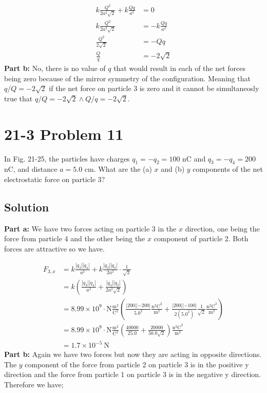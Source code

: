 \documentclass{article}
\begin{document}
\begin{align*}
    k \frac{Q^2}{2a^2\sqrt{2}} + k \frac{Qq}{a^2} &= 0 \\
    k \frac{Q^2}{2a^2\sqrt{2}} &= - k \frac{Qq}{a^2} \\
    \frac{Q^2}{2\sqrt{2}} &= - Qq \\
    \frac{Q}{q} &= \boxed{- 2 \sqrt{2}}
\end{align*}
\textbf{Part b:} No, there is no value of $q$ that would result in each of the net forces being zero because of the mirror symmetry of the configuration.
Meaning that $q/Q = -2\sqrt{2}$ if the net force on particle 3 is zero and it cannot be simultaneosly true that $q/Q = -2\sqrt{2} \wedge Q/q = -2\sqrt{2}$.

\section*{21-3 Problem 11}
In Fig. 21-25, the particles have charges $q_1 = -q_2 = 100$ nC and $q_3 = -q_4 = 200$ nC, and distance $a = 5.0$ cm.
What are the (a) $x$ and (b) $y$ components of the net electrostatic force on particle 3?

\subsection*{Solution}
\textbf{Part a:} We have two forces acting on particle 3 in the $x$ direction, one being the force from particle 4 and the other being the $x$ component of particle 2.
Both forces are attractive so we have.

\begin{align*}
    F_{3, x} &= k \frac{|q_3||q_4|}{a^2} + k \frac{|q_3||q_2|}{2a^2} \cdot \frac{1}{\sqrt{2}} \\
    &= k \left( \frac{|q_3||q_4|}{a^2} + \frac{|q_3||q_2|}{2a^2\sqrt{2}} \right) \\
    &= 8.99 \times 10^9 \cdot \text{N} \frac{\text{m}^2}{\text{C}^2} \left( \frac{|200||-200|}{5.0^2} \frac{\text{n$^2$C}^2}{\text{m}^2} + \frac{|200||-100|}{2(5.0^2)} \frac{1}{\sqrt{2}} \frac{\text{n$^2$C}^2}{\text{m}^2} \right) \\
    &= 8.99 \times 10^9 \cdot \text{N} \frac{\text{m}^2}{\text{C}^2} \left( \frac{40000}{25.0} + \frac{20000}{50.0 \sqrt{2}}  \right) \frac{\text{n$^2$C}^2}{\text{m}^2}\\
    &= \boxed{1.7 \times 10^{-5} \ \text{N}}
\end{align*}
\textbf{Part b:} Again we have two forces but now they are acting in opposite directions.
The $y$ component of the force from particle 2 on particle 3 is in the positive y direction and the force from particle 1 on particle 3 is in the negative y direction.
Therefore we have;
\end{document}
